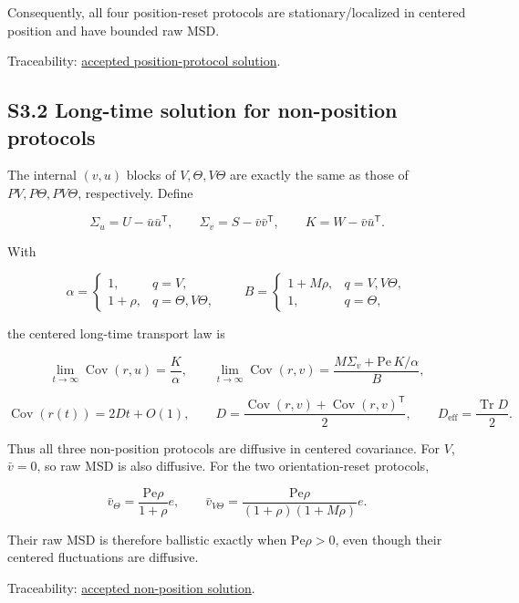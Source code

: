 Consequently, all four position-reset protocols are stationary/localized in centered position and have bounded raw MSD.

Traceability: \href{https://github.com/blakepi/phasemap-reproducibility/blob/v3.1.1/artifacts/derived/T-020-position-protocols.md}{accepted position-protocol solution}.

\subsection{S3.2 Long-time solution for non-position protocols}\label{s3.2-long-time-solution-for-non-position-protocols}

The internal \((v,u)\) blocks of \(V,\Theta,V\Theta\) are exactly the same as those of \(PV,P\Theta,PV\Theta\), respectively. Define

\[
\Sigma_u=U-\bar u\bar u^\mathsf T,\qquad
\Sigma_v=S-\bar v\bar v^\mathsf T,\qquad
K=W-\bar v\bar u^\mathsf T.
\]

With

\[
\alpha=
\begin{cases}
1,&q=V,\\
1+\rho,&q=\Theta,V\Theta,
\end{cases}
\qquad
B=
\begin{cases}
1+M\rho,&q=V,V\Theta,\\
1,&q=\Theta,
\end{cases}
\]

the centered long-time transport law is

\[
\lim_{t\to\infty}\operatorname{Cov}(r,u)=\frac{K}{\alpha},
\qquad
\lim_{t\to\infty}\operatorname{Cov}(r,v)
=\frac{M\Sigma_v+\mathrm{Pe}\,K/\alpha}{B},
\]

\[
\operatorname{Cov}(r(t))=2Dt+O(1),\qquad
D=\frac{\operatorname{Cov}(r,v)+
        \operatorname{Cov}(r,v)^\mathsf T}{2},
\qquad
D_{\mathrm{eff}}=\frac{\operatorname{Tr}D}{2}.
\]

Thus all three non-position protocols are diffusive in centered covariance. For \(V\), \(\bar v=0\), so raw MSD is also diffusive. For the two orientation-reset protocols,

\[
\bar v_\Theta=\frac{\mathrm{Pe}\rho}{1+\rho}e,\qquad
\bar v_{V\Theta}
=\frac{\mathrm{Pe}\rho}{(1+\rho)(1+M\rho)}e.
\]

Their raw MSD is therefore ballistic exactly when \(\mathrm{Pe}\rho>0\), even though their centered fluctuations are diffusive.

Traceability: \href{https://github.com/blakepi/phasemap-reproducibility/blob/v3.1.1/artifacts/derived/T-021-nonposition-protocols.md}{accepted non-position solution}.

